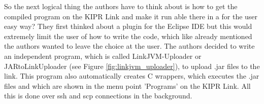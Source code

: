 \documentclass{juniorjournal}
\begin{document}
So the next logical thing the authors have to think about is how to get the compiled 
program on the KIPR Link and make it run able there in a for the user easy way?
They first thinked about a plugin for the Eclipse IDE but this would extremely 
limit the user of how to write the code, which like already mentioned the 
authors wanted to leave the choice at the user.
The authors decided to write an independent program, which is called 
LinkJVM-Uploader or JARtoLinkUploader (see Figure \ref{fig:linkjvm_uploader}), 
to upload .jar files to the link. This program also automatically creates C 
wrappers, which executes the .jar files and which are shown in the menu point 
'Programs' on the KIPR Link. All this is done over ssh and scp connections in 
the background.

\begin{thebibliography}{500} %

\end{thebibliography}
\end{document}
